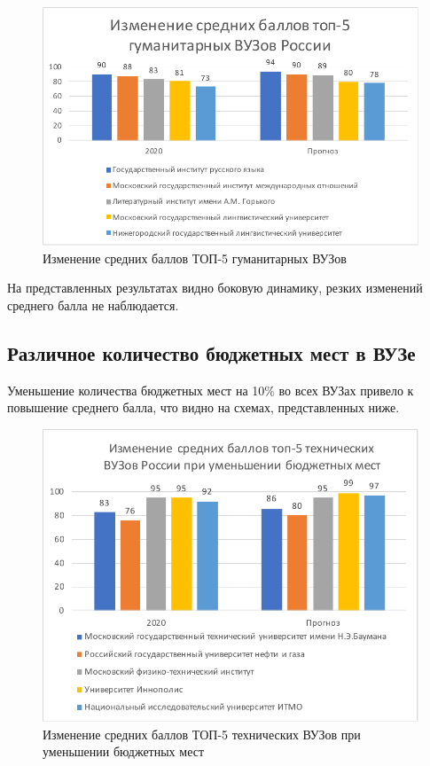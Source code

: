 \begin{figure}[hbtp]
	\centering
	\includegraphics[scale=1.0]{img/top5gym.pdf.pdf}
	\caption{Изменение средних баллов ТОП-5 гуманитарных ВУЗов}
	\label{top5gym}
\end{figure} 	

На представленных результатах видно боковую динамику, резких изменений среднего балла не наблюдается.

\subsection{Различное количество бюджетных мест в ВУЗе}

Уменьшение количества бюджетных мест на 10\% во всех ВУЗах привело к повышение среднего балла, что видно на схемах, представленных ниже.

\begin{figure}[hbtp]
	\centering
	\includegraphics[scale=1.0]{img/top5techdown.pdf.pdf}
	\caption{Изменение средних баллов ТОП-5 технических ВУЗов при уменьшении бюджетных мест}
	\label{top5techdown}
\end{figure} 

